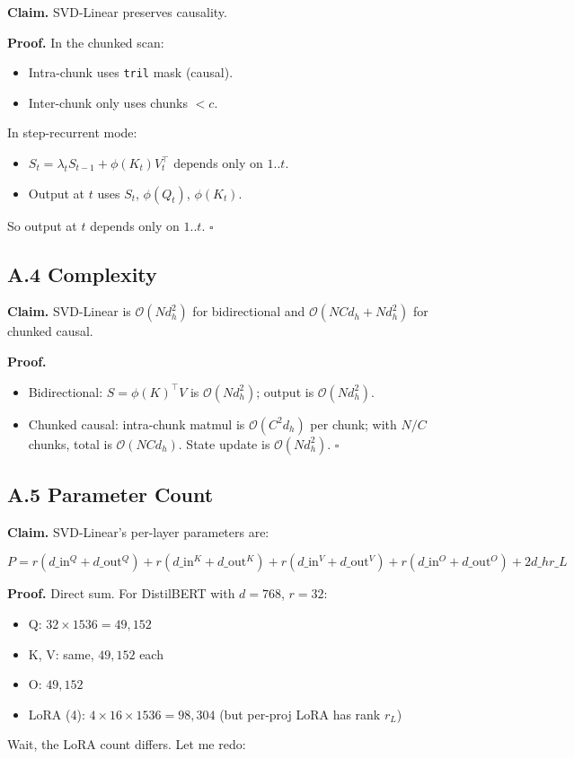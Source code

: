 \textbf{Claim.} SVD-Linear preserves causality.

\textbf{Proof.} In the chunked scan:
\begin{itemize}
\item Intra-chunk uses \texttt{tril} mask (causal).
\item Inter-chunk only uses chunks $< c$.

\end{itemize}
In step-recurrent mode:
\begin{itemize}
\item $S_t = \lambda_t S_{t-1} + \phi(K_t) V_t^\top$ depends only on $1..t$.
\item Output at $t$ uses $S_t$, $\phi(Q_t)$, $\phi(K_t)$.

\end{itemize}
So output at $t$ depends only on $1..t$. $\square$

\subsection{A.4 Complexity}

\textbf{Claim.} SVD-Linear is $\mathcal{O}(N d_h^2)$ for bidirectional and 
$\mathcal{O}(N C d_h + N d_h^2)$ for chunked causal.

\textbf{Proof.} 
\begin{itemize}
\item Bidirectional: $S = \phi(K)^\top V$ is $\mathcal{O}(N d_h^2)$; output
  is $\mathcal{O}(N d_h^2)$.
\item Chunked causal: intra-chunk matmul is $\mathcal{O}(C^2 d_h)$ per chunk;
  with $N/C$ chunks, total is $\mathcal{O}(N C d_h)$. State update is
  $\mathcal{O}(N d_h^2)$. $\square$

\end{itemize}
\subsection{A.5 Parameter Count}

\textbf{Claim.} SVD-Linear's per-layer parameters are:

\[
P = r(d\_\text{in}^Q + d\_\text{out}^Q) + r(d\_\text{in}^K + d\_\text{out}^K) + r(d\_\text{in}^V + d\_\text{out}^V) + r(d\_\text{in}^O + d\_\text{out}^O) + 2 d\_h r\_L
\]

\textbf{Proof.} Direct sum. For DistilBERT with $d = 768$, $r = 32$:

\begin{itemize}
\item Q: $32 \times 1536 = 49,152$
\item K, V: same, $49,152$ each
\item O: $49,152$
\item LoRA (4): $4 \times 16 \times 1536 = 98,304$ (but per-proj LoRA has rank $r_L$)

\end{itemize}
Wait, the LoRA count differs. Let me redo:

